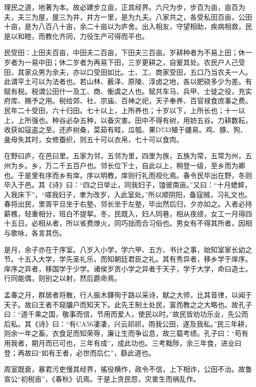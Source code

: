 \documentclass[]{article}
\begin{document}
理民之道，地著为本。故必建步立亩，正其经界。六尺为步，步百为亩，亩百为夫，夫三为屋，屋三为井，井方一里，是为九夫。八家共之，各受私田百亩，公田十亩，是为八百八十亩，余二十亩以为庐舍。出入相友，守望相助，疾病相救，民是以和睦，而教化齐同，力役生产可得而平也。

民受田：上田夫百亩，中田夫二百亩，下田夫三百亩。岁耕种者为不易上田；休一岁者为一易中田；休二岁者为再易下田，三岁更耕之，自爰其处。农民户人己受田，其家众男为余夫，亦以口受田如比。士、工、商家受田，五口乃当农夫一人。此谓平土可以为法者也。若山林、薮泽、原陵、淳卤之地，各以肥硗多少为差。有赋有税。税谓公田什一及工、商、衡虞之人也。赋共车马、兵甲、士徒之役，充实府库、赐予之用。税给郊、社、宗庙、百神之祀，天子奉养、百官禄食庶事之费。民年二十受田，六十归田。七十以上，上所养也；十岁以下，上所长也；十一以上，上所强也。种谷必杂五种，以备灾害。田中不得有树，用妨五谷。力耕数耘，收获如寇盗之至。还庐树桑，菜茹有畦，瓜瓠、果D733殖于疆易。鸡、豚、狗、彘毋失其时，女修蚕织，则五十可以衣帛，七十可以食肉。

在野曰庐，在邑曰里。五家为邻，五邻为里，四里为族，五族为常，五常为州，五州为乡。乡，万二千五百户也。邻长位下士，自此以上，稍登一级，至乡而为卿也。于是里有序而乡有庠。序以明教，庠则行礼而视化焉。春令民毕出在野，冬则毕入于邑。其《诗》曰：``四之日举止，同我妇子，馌彼南亩。''又曰：``十月蟋蟀，入我床下''，``嗟我妇子，聿为改岁，入此室处。''所以顺阴阳，备寇贼，习礼文也。春将出民，里胥平旦坐于右塾，邻长坐于左塾，毕出然后归，夕亦如之。入者必持薪樵，轻重相分，班白不提挈。冬，民既入，妇人同巷，相从夜绩，女工一月得四十五日。必相从者，所以省费燎火，同巧拙而合习俗也。男女有不得其所者，因相与歌咏，各言其伤。

是月，余子亦在于序室。八岁入小学，学六甲、五方、书计之事，始知室家长幼之节。十五入大学，学先圣礼乐，而知朝廷君臣之礼。其有秀异者，移乡学于庠序。庠序之异者，移国学于少学。诸侯岁贡小学之异者于天子，学于大学，命曰造士。行同能偶，则别之以射，然后爵命焉。

孟春之月，群居者将散，行人振木鐸徇于路以采诗，献之大师，比其音律，以闻于天子。故曰王者不窥牖户而知天下。此先王制土处民，富而教之之大略也。故孔子曰：``道千乘之国，敬事而信，节用而爱人，使民以时。''故民皆劝功乐业，先公而后私。其《诗》曰：``有CA56凄凄，兴云祁祁，雨我公田，遂及我私。''民三年耕，则余一年之畜。衣食足而知荣辱，廉让生而争讼息，故三载考绩。孔子曰：``苟有用我者，期月而已可也，三年有成''，成此功也。三考黜陟，余三年食，进业曰登；再故曰``如有王者，必世而后仁''，繇此道也。

周室既衰，暴君污吏慢其经界，徭役横作，政令不信，上下相诈，公田不治。故鲁宣公``初税亩''，《春秋》讥焉。于是上贪民怨，灾害生而祸乱作。
\end{document}
